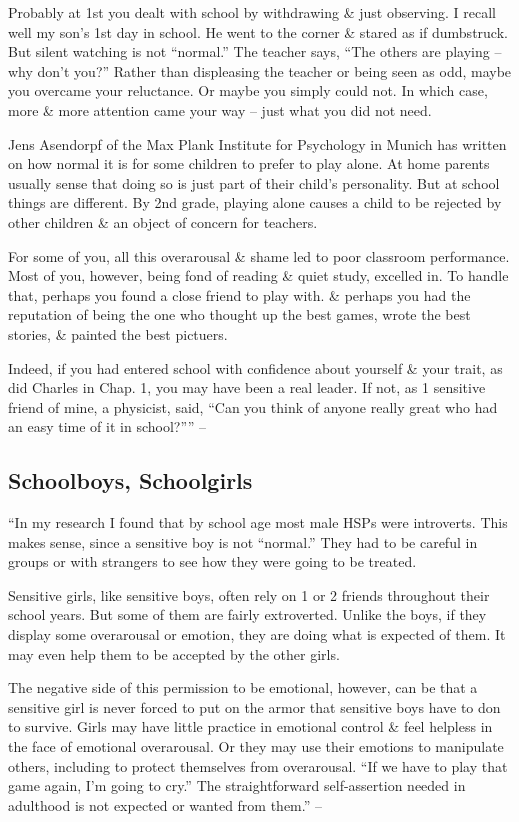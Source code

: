 \documentclass{article}
\numberwithin{equation}{section}
\begin{document}
Probably at 1st you dealt with school by withdrawing \& just observing. I recall well my son's 1st day in school. He went to the corner \& stared as if dumbstruck. But silent watching is not ``normal.'' The teacher says, ``The others are playing -- why don't you?'' Rather than displeasing the teacher or being seen as odd, maybe you overcame your reluctance. Or maybe you simply could not. In which case, more \& more attention came your way -- just what you did not need.

Jens Asendorpf of the Max Plank Institute for Psychology in Munich has written on how normal it is for some children to prefer to play alone. At home parents usually sense that doing so is just part of their child's personality. But at school things are different. By 2nd grade, playing alone causes a child to be rejected by other children \& an object of concern for teachers.

For some of you, all this overarousal \& shame led to poor classroom performance. Most of you, however, being fond of reading \& quiet study, excelled in. To handle that, perhaps you found a close friend to play with. \& perhaps you had the reputation of being the one who thought up the best games, wrote the best stories, \& painted the best pictuers.

Indeed, if you had entered school with confidence about yourself \& your trait, as did Charles in Chap. 1, you may have been a real leader. If not, as 1 sensitive friend of mine, a physicist, said, ``Can you think of anyone really great who had an easy time of it in school?'''' -- \cite[pp. 113--114]{Aron2013}

\subsection{Schoolboys, Schoolgirls}
``In my research I found that by school age most male HSPs were introverts. This makes sense, since a sensitive boy is not ``normal.'' They had to be careful in groups or with strangers to see how they were going to be treated.

Sensitive girls, like sensitive boys, often rely on 1 or 2 friends throughout their school years. But some of them are fairly extroverted. Unlike the boys, if they display some overarousal or emotion, they are doing what is expected of them. It may even help them to be accepted by the other girls.

The negative side of this permission to be emotional, however, can be that a sensitive girl is never forced to put on the armor that sensitive boys have to don to survive. Girls may have little practice in emotional control \& feel helpless in the face of emotional overarousal. Or they may use their emotions to manipulate others, including to protect themselves from overarousal. ``If we have to play that game again, I'm going to cry.'' The straightforward self-assertion needed in adulthood is not expected or wanted from them.'' -- \cite[pp. 114--115]{Aron2013}
\end{document}
